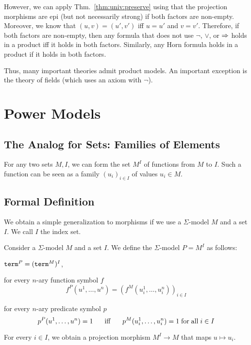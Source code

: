 However, we can apply Thm.~\ref{thm:univ:preserve} using that the projection morphisms are epi (but not necessarily strong) if both factors are non-empty.
Moreover, we know that $(u,v)=(u',v')$ iff $u=u'$ and $v=v'$.
Therefore, if both factors are non-empty, then any formula that does not use $\neg$, $\vee$, or $\Rightarrow$ holds in a product iff it holds in both factors.
Similarly, any Horn formula holds in a product if it holds in both factors.

Thus, many important theories admit product models.
An important exception is the theory of fields (which uses an axiom with $\neg$). 

\section{Power Models}\label{sec:univ:exp}

\subsection{The Analog for Sets: Families of Elements}

For any two sets $M,I$, we can form the set $M^I$ of functions from $M$ to $I$.
Such a function can be seen as a family $(u_i)_{i\in I}$ of values $u_i\in M$.

\subsection{Formal Definition}

We obtain a simple generalization to morphisms if we use a $\Sigma$-model $M$ and a set $I$.
We call $I$ the index set.

\begin{definition}
Consider a $\Sigma$-model $M$ and a set $I$.
We define the $\Sigma$-model $P=M^I$ as follows:
\begin{compactitem}
\item $\mathtt{term}^{P}=(\mathtt{term}^{M})^I$,
\item for every $n$-ary function symbol $f$
 \[f^{P}(u^1,\ldots,u^n)=(f^{M}(u^1_i,\ldots,u^n_i))_{i\in I}\]
\item for every $n$-ary predicate symbol $p$
 \[p^{P}(u^1,\ldots,u^n)=1 \hspace*{.5cm}\;\mathrm{iff}\;\hspace*{.5cm} p^{M}(u^1_i,\ldots,u^n_i)=1 \;\mathrm{for}\;\mathrm{all}\; i\in I\]
\end{compactitem}
\end{definition}

For every $i\in I$, we obtain a projection morphism $M^I\to M$ that maps $u\mapsto u_i$.

